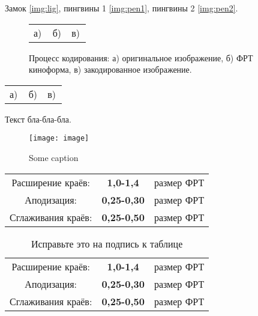 \documentclass[a4paper,12pt]{report} %
\begin{document}
Замок \ref{img:lig}, пингвины 1 \ref{img:pen1}, пингвины 2 \ref{img:pen2}.
\begin{figure}[H]
\begin{minipage}[h]{0.32\linewidth}
\end{minipage}
\hfill
\begin{minipage}[h]{0.32\linewidth}
\end{minipage}
\hfill
\begin{minipage}[h]{0.32\linewidth}
\end{minipage}
\begin{minipage}[h]{1\linewidth}
\begin{tabular}{p{0.32\linewidth}p{0.32\linewidth}p{0.32\linewidth}}
\centering а) & \centering б) & \centering в) \\
\end{tabular}
\end{minipage}
\vspace*{-1cm}
\caption{Процесс кодирования: а) оригинальное изображение, б) ФРТ киноформа, в) закодированное изображение.}
\label{ris:correlationsignals}
\end{figure}
\begin{minipage}[h]{1\linewidth}
\begin{tabular}{p{0.32\linewidth}p{0.32\linewidth}p{0.32\linewidth}}
\centering а) & \centering б) & \centering в) \\
\end{tabular}
\end{minipage}
Текст бла-бла-бла.
\begin{wrapfigure}[16]{r}{0.5\linewidth} 
\vspace{-5ex}
\texttt{[image: image]}
\caption{Some caption}
\label{fig:somelabel}
\end{wrapfigure}
\pagebreak
\begin{center}
\begin{tabular}{ccc}
Расширение краёв: & \textbf{1,0-1,4} & размер ФРТ \\
Аподизация: & \textbf{0,25-0,30}& размер ФРТ \\
Сглаживания краёв: & \textbf{0,25-0,50}& размер ФРТ \\
\end{tabular}
\begin{table}[H]
\caption{Исправьте это на подпись к таблице}
\label{tabular:timesandtenses}
\begin{center}
\begin{tabular}{ccc}
Расширение краёв: & \textbf{1,0-1,4} & размер ФРТ \\
Аподизация: & \textbf{0,25-0,30}& размер ФРТ \\
Сглаживания краёв: & \textbf{0,25-0,50}& размер ФРТ \\
\end{tabular}
\end{center}
\end{table}
\end{center}
\end{document}
